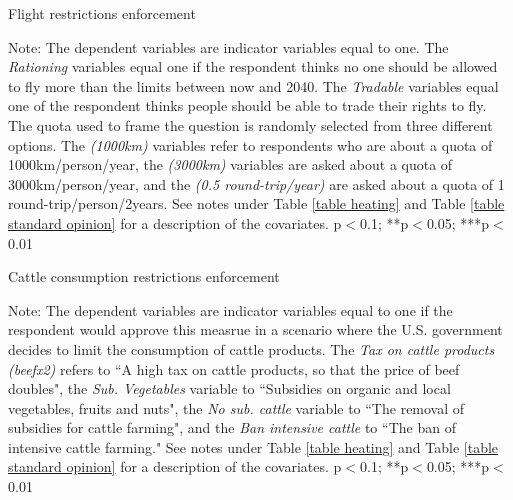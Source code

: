 \documentclass{article}
\begin{document}
\begin{landscape}
	\begin{table}[h!]
	\caption{Flight restrictions enforcement}
	\begin{center}
		\scalebox{0.6}{}
	\end{center}
	{\footnotesize Note: The dependent variables are indicator variables equal to one. The \textit{Rationing} variables equal one if the respondent thinks no one should be allowed to fly more than the limits between now and 2040. The \textit{Tradable} variables equal one of the respondent thinks people should be able to trade their rights to fly. The quota used to frame the question is randomly selected from three different options. The \textit{(1000km)} variables refer to respondents who are about a quota of 1000km/person/year, the \textit{(3000km)} variables are asked about a quota of 3000km/person/year, and the \textit{(0.5 round-trip/year)} are asked about a quota of 1 round-trip/person/2years.  See notes under Table \ref{table heating} and Table \ref{table standard opinion} for a description of the covariates.
	\newline *p$<$0.1; **p$<$0.05; ***p$<$0.01}
\end{table}	
\end{landscape}

\begin{table}[h!]
	\caption{Cattle consumption restrictions enforcement}
	\begin{center}
		\scalebox{0.7}{}
	\end{center}
	{\footnotesize Note: The dependent variables are indicator variables equal to one if the respondent would approve this measrue in a scenario where the U.S. government decides to limit the consumption of cattle products. The \textit{Tax on cattle products (beefx2)} refers to ``A high tax on cattle products, so that the price of beef doubles", the \textit{Sub. Vegetables} variable to ``Subsidies on organic and local vegetables, fruits and nuts", the \textit{No sub. cattle} variable to ``The removal of subsidies for cattle farming", and the \textit{Ban intensive cattle} to ``The ban of intensive cattle farming." See notes under Table \ref{table heating} and Table \ref{table standard opinion} for a description of the covariates.
	\newline *p$<$0.1; **p$<$0.05; ***p$<$0.01}
\end{table}	
\end{document}
